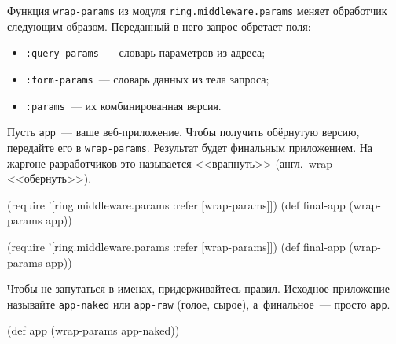 
\mnoindent
Функция \verb|wrap-params| из модуля \texttt{ring.middle\-ware.params} меняет
обработчик следующим образом. Переданный в него запрос обретает поля:

\begin{itemize}

\item
  \verb|:query-params|~--- словарь параметров из адреса;

\item
  \verb|:form-params|~--- словарь данных из тела запроса;

\item
  \verb|:params|~--- их комбинированная версия.

\end{itemize}

Пусть \verb|app|~--- ваше веб-приложение. Чтобы получить обёрнутую версию,
передайте его в \verb|wrap-params|. Результат будет финальным приложением. На
жаргоне разработчиков это называется <<врапнуть>> (англ.~wrap~--- <<обернуть>>).


\ifx\DEVICETYPE\MOBILE

\begin{english}
  \begin{clojure}
(require '[ring.middleware.params
           :refer [wrap-params]])
(def final-app (wrap-params app))
  \end{clojure}
\end{english}

\else

\begin{english}
  \begin{clojure}
(require '[ring.middleware.params :refer [wrap-params]])
(def final-app (wrap-params app))
  \end{clojure}
\end{english}

\fi

Чтобы не запутаться в именах, придерживайтесь правил. Исходное приложение
называйте \verb|app-naked| или \verb|app-raw| (голое, сырое), а~финальное~---
просто \verb|app|.

\begin{english}
  \begin{clojure}
(def app (wrap-params app-naked))
  \end{clojure}
\end{english}

